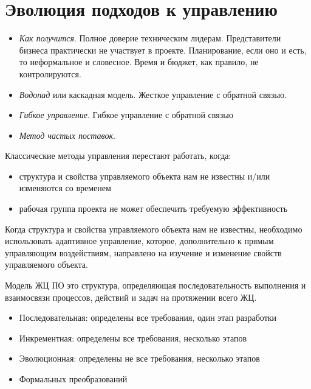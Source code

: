 \documentclass{beamer}
\begin{document}
\section{Эволюция подходов к управлению}
\begin{frame}[t]
\begin{itemize}
\item \textit{Как получится}. Полное доверие техническим лидерам. Представители бизнеса практически не участвует в проекте. Планирование, если оно и есть, то неформальное и словесное. Время
и бюджет, как правило, не контролируются.
\item \textit{Водопад} или каскадная модель. Жесткое управление с обратной связью.
\item \textit{Гибкое управление}. Гибкое управление с обратной связью
\item \textit{Метод частых поставок}.
\end{itemize}
Классические методы управления перестают работать, когда:
\begin{itemize}
\item структура и свойства управляемого объекта нам не известны и/или изменяются со временем
\item рабочая группа проекта не может обеспечить требуемую эффективность
\end{itemize}
Когда структура и свойства управляемого объекта нам не известны, необходимо использовать адаптивное управление, которое, дополнительно к прямым управляющим воздействиям, направлено на изучение и изменение свойств управляемого объекта.
\end{frame}

\begin{frame}[t]
\begin{block}{Модель ЖЦ ПО} 
это структура, определяющая последовательность выполнения и взаимосвязи процессов, действий и задач на
протяжении всего ЖЦ. 
\end{block}
\begin{itemize}
\item Последовательная: определены все требования, один этап разработки
\item Инкрементная: определены все требования, несколько этапов
\item Эволюционная: определены не все требования, несколько этапов
\item Формальных преобразований
\end{itemize}
\end{frame}
\end{document}
